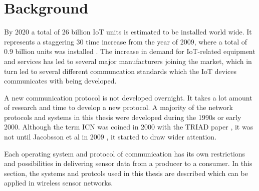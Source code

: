 \section{Background}

%
By 2020 a total of 26 billion IoT units is estimated to be installed world wide. It represents a staggering 30 time increase from the year of 2009, where a total of 0.9 billion units was installed \cite{Gartner}.  The increase in demand for IoT-related equipment and services has led to several major manufacturers joining the market, which in turn led to several different communcation standards which the IoT devices communicates with being developed. 

A new communication protocol is not developed overnight. It takes a lot amount of research and time to develop a new protocol. A majority of the network protocols and systems in this thesis were developed during the 1990s or early 2000. Although the term ICN was coined in 2000 with the TRIAD paper \cite{TRIAD}, it was not until Jacobsson et al in 2009 \cite{Jacobson2009}, it started to draw wider attention.

Each operating system and protocol of communication has its own restrictions and possibilities in delivering sensor data from a producer to a consumer.
In this section, the systems and protcols used in this thesis are described which can be applied in wireless sensor networks.







%
